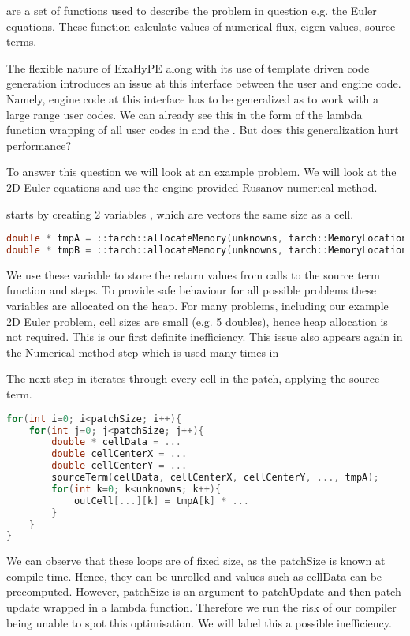  are a set of functions used to describe the problem in question e.g. the Euler equations.
These function calculate values of numerical flux, eigen values, source terms.

The flexible nature of ExaHyPE along with its use of template driven code generation introduces an issue at this interface between the user and engine code.
Namely, engine code at this interface has to be generalized as to work with a large range user codes.
We can already see this in the form of the lambda function wrapping of all user codes in  and the .
But does this generalization hurt performance?

To answer this question we will look at an example problem.
We will look at the 2D Euler equations and use the engine provided Rusanov numerical method.


 starts by creating 2 variables ,  which are vectors the same size as a cell.

\begin{lstlisting}[language=c]
double * tmpA = ::tarch::allocateMemory(unknowns, tarch::MemoryLocation::Heap);
double * tmpB = ::tarch::allocateMemory(unknowns, tarch::MemoryLocation::Heap);
\end{lstlisting}

We use these variable to store the return values from calls to the source term function and  steps.
To provide safe behaviour for all possible problems these variables are allocated on the heap.
For many problems, including our example 2D Euler problem, cell sizes are small (e.g. 5 doubles), hence heap allocation is not required. 
This is our first definite inefficiency.
This issue also appears again in the Numerical method step which is used many times in 

The next step in  iterates through every cell in the patch, applying the source term.
\begin{lstlisting}[language=c]
for(int i=0; i<patchSize; i++){
    for(int j=0; j<patchSize; j++){
        double * cellData = ...
        double cellCenterX = ...
        double cellCenterY = ...    
        sourceTerm(cellData, cellCenterX, cellCenterY, ..., tmpA);
        for(int k=0; k<unknowns; k++){
            outCell[...][k] = tmpA[k] * ...
        }
    }
}
\end{lstlisting}


We can observe that these loops are of fixed size, as the patchSize is known at compile time. 
Hence, they can be unrolled and values such as cellData can be precomputed.   
However, patchSize is an argument to patchUpdate and then patch update wrapped in a lambda function.
Therefore we run the risk of our compiler being unable to spot this optimisation.
We will label this a possible inefficiency.


